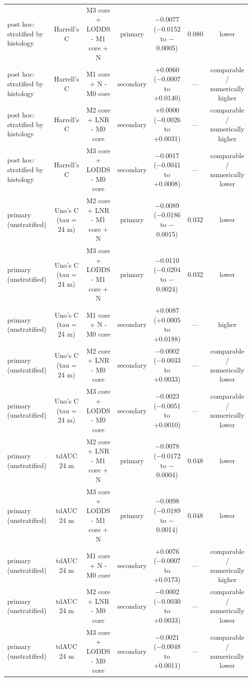 \begin{table}[htbp]
{\begin{tabular}{@{}lcccccc@{}}
post hoc: stratified by histology & Harrell's C & M3 core + LODDS - M1 core + N & primary & $-$0.0077 ($-$0.0152 to $-$0.0005) & 0.080 & lower \\
post hoc: stratified by histology & Harrell's C & M1 core + N - M0 core & secondary & +0.0060 ($-$0.0007 to +0.0140) & --- & comparable / numerically higher \\
post hoc: stratified by histology & Harrell's C & M2 core + LNR - M0 core & secondary & +0.0000 ($-$0.0026 to +0.0031) & --- & comparable / numerically higher \\
post hoc: stratified by histology & Harrell's C & M3 core + LODDS - M0 core & secondary & $-$0.0017 ($-$0.0041 to +0.0008) & --- & comparable / numerically lower \\
primary (unstratified) & Uno's C (tau = 24 m) & M2 core + LNR - M1 core + N & primary & $-$0.0089 ($-$0.0186 to $-$0.0015) & 0.032 & lower \\
primary (unstratified) & Uno's C (tau = 24 m) & M3 core + LODDS - M1 core + N & primary & $-$0.0110 ($-$0.0204 to $-$0.0024) & 0.032 & lower \\
primary (unstratified) & Uno's C (tau = 24 m) & M1 core + N - M0 core & secondary & +0.0087 (+0.0005 to +0.0188) & --- & higher \\
primary (unstratified) & Uno's C (tau = 24 m) & M2 core + LNR - M0 core & secondary & $-$0.0002 ($-$0.0033 to +0.0033) & --- & comparable / numerically lower \\
primary (unstratified) & Uno's C (tau = 24 m) & M3 core + LODDS - M0 core & secondary & $-$0.0023 ($-$0.0051 to +0.0010) & --- & comparable / numerically lower \\
primary (unstratified) & tdAUC 24 m & M2 core + LNR - M1 core + N & primary & $-$0.0078 ($-$0.0172 to $-$0.0004) & 0.048 & lower \\
primary (unstratified) & tdAUC 24 m & M3 core + LODDS - M1 core + N & primary & $-$0.0098 ($-$0.0189 to $-$0.0014) & 0.048 & lower \\
primary (unstratified) & tdAUC 24 m & M1 core + N - M0 core & secondary & +0.0076 ($-$0.0007 to +0.0173) & --- & comparable / numerically higher \\
primary (unstratified) & tdAUC 24 m & M2 core + LNR - M0 core & secondary & $-$0.0002 ($-$0.0030 to +0.0033) & --- & comparable / numerically lower \\
primary (unstratified) & tdAUC 24 m & M3 core + LODDS - M0 core & secondary & $-$0.0021 ($-$0.0048 to +0.0011) & --- & comparable / numerically lower \\

\end{tabular}}
\end{table}
